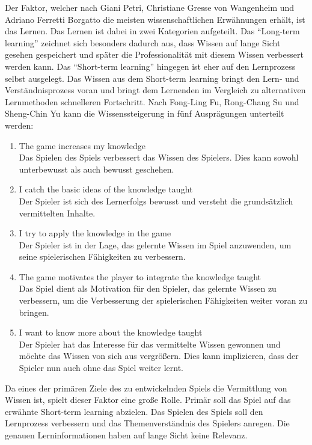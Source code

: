 	Der Faktor, welcher nach Giani Petri, Christiane Gresse von Wangenheim und Adriano Ferretti Borgatto die meisten wissenschaftlichen Erwähnungen erhält, ist das Lernen. Das Lernen ist dabei in zwei Kategorien aufgeteilt. Das \enquote{Long-term learning} zeichnet sich besonders dadurch aus, dass Wissen auf lange Sicht gesehen gespeichert und später die Professionalität mit diesem Wissen verbessert werden kann. Das \enquote{Short-term learning} hingegen ist eher auf den Lernprozess selbst ausgelegt. Das Wissen aus dem Short-term learning bringt den Lern- und Verständnisprozess voran und bringt dem Lernenden im Vergleich zu alternativen Lernmethoden schnelleren Fortschritt. Nach Fong-Ling Fu, Rong-Chang Su und Sheng-Chin Yu kann die Wissenssteigerung in fünf Ausprägungen unterteilt werden:
	\begin{enumerate}
		\item{The game increases my knowledge} \hfill \\
		Das Spielen des Spiels verbessert das Wissen des Spielers. Dies kann sowohl unterbewusst als auch bewusst geschehen.
		\item{I catch the basic ideas of the knowledge taught} \hfill \\
		Der Spieler ist sich des Lernerfolgs bewusst und versteht die grundsätzlich vermittelten Inhalte.
		\item{I try to apply the knowledge in the game}\hfill \\
		Der Spieler ist in der Lage, das gelernte Wissen im Spiel anzuwenden, um seine spielerischen Fähigkeiten zu verbessern.
		\item{The game motivates the player to integrate the knowledge taught}\hfill \\
		Das Spiel dient als Motivation für den Spieler, das gelernte Wissen zu verbessern, um die Verbesserung der spielerischen Fähigkeiten weiter voran zu bringen.
		\item{I want to know more about the knowledge taught}\hfill \\
		Der Spieler hat das Interesse für das vermittelte Wissen gewonnen und möchte das Wissen von sich aus vergrößern. Dies kann implizieren, dass der Spieler nun auch ohne das Spiel weiter lernt.
	\end{enumerate}
	Da eines der primären Ziele des zu entwickelnden Spiels die Vermittlung von Wissen ist, spielt dieser Faktor eine große Rolle. Primär soll das Spiel auf das erwähnte Short-term learning abzielen. Das Spielen des Spiels soll den Lernprozess verbessern und das Themenverständnis des Spielers anregen. Die genauen Lerninformationen haben auf lange Sicht keine Relevanz.

